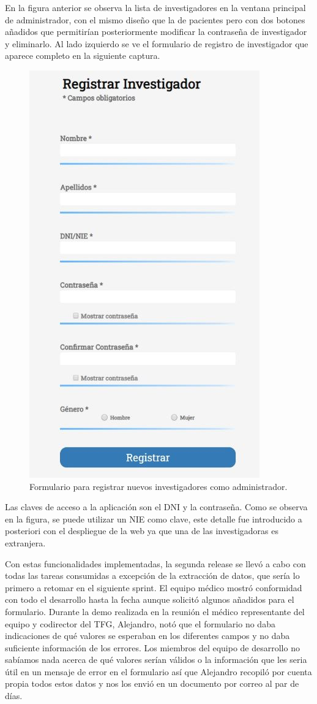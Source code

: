 En la figura anterior se observa la lista de investigadores en la ventana principal de administrador, con el mismo diseño que la de pacientes pero con dos botones añadidos que permitirían posteriormente modificar la contraseña de investigador y eliminarlo. Al lado izquierdo se ve el formulario de registro de investigador que aparece completo en la siguiente captura.

\begin{figure}[h]
    \centering
     \includegraphics[width=6.cm,height=10.cm]{images/registrarInvestigadores.jpg}
    \caption{Formulario para registrar nuevos investigadores como administrador.}
\end{figure}
\newpage

Las claves de acceso a la aplicación son el DNI y la contraseña. Como se observa en la figura, se puede utilizar un NIE como clave, este detalle fue introducido a posteriori con el despliegue de la web ya que una de las investigadoras es extranjera.
\newline

Con estas funcionalidades implementadas, la segunda release se llevó a cabo con todas las tareas consumidas a excepción de la extracción de datos, que sería lo primero a retomar en el siguiente sprint. El equipo médico mostró conformidad con todo el desarrollo hasta la fecha aunque solicitó algunos añadidos para el formulario. Durante la demo realizada en la reunión el médico representante del equipo y codirector del TFG, Alejandro, notó que el formulario no daba indicaciones de qué valores se esperaban en los diferentes campos y no daba suficiente información de los errores. Los miembros del equipo de desarrollo no sabíamos nada acerca de qué valores serían válidos o la información que les seria útil en un mensaje de error en el formulario así que Alejandro recopiló por cuenta propia todos estos datos y nos los envió en un documento por correo al par de días.

